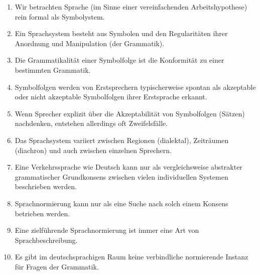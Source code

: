 \Zusammenfassung

\begin{enumerate}
  \item Wir betrachten Sprache (im Sinne einer vereinfachenden Arbeitshypothese) rein formal als Symbolystem.
  \item Ein Sprachsystem besteht aus Symbolen und den Regularitäten ihrer Anordnung und Manipulation (der Grammatik).
  \item Die Grammatikalität einer Symbolfolge ist die Konformität zu einer bestimmten Grammatik.
  \item Symbolfolgen werden von Erstsprechern typischerweise spontan als akzeptable oder nicht akzeptable Symbolfolgen ihrer Erstsprache erkannt.
  \item Wenn Sprecher explizit über die Akzeptabilität von Symbolfolgen (\zB Sätzen) nachdenken, entstehen allerdings oft Zweifelsfälle.
  \item Das Sprachsystem variiert zwischen Regionen (dialektal), Zeiträumen (diachron) und auch zwischen einzelnen Sprechern.
  \item Eine Verkehrssprache wie Deutsch kann nur als vergleichsweise abstrakter grammatischer Grundkonsens zwischen vielen individuellen Systemen beschrieben werden.
  \item Sprachnormierung kann nur als eine Suche nach solch einem Konsens betrieben werden.
  \item Eine zielführende Sprachnormierung ist immer eine Art von Sprachbeschreibung.
  \item Es gibt im deutschsprachigen Raum keine verbindliche normierende Instanz für Fragen der Grammatik.
\end{enumerate}
